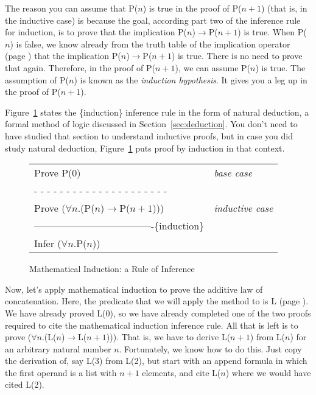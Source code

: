 The reason you can assume that P($n$) is true in the proof of P($n+1$)
(that is, in the inductive case)
is because the goal, according part two of the inference rule
for induction, is to prove that the implication
P($n$)$\rightarrow$P($n+1$) is true.
When P($n$) is false, we know already from the truth table
of the implication operator (page \pageref{implication-truth-table})
that the implication P($n$)$\rightarrow$P($n+1$) is true.
There is no need to prove that again.
Therefore, in the proof of P($n+1$), we can assume P($n$) is true.
The assumption of P($n$) is known as the
\emph{induction hypothesis}.
It gives you a leg up in the proof of P($n+1$).

Figure~\ref{induction-rule} states the \{induction\} inference rule
in the form of natural deduction, a formal method of logic discussed
in Section~\ref{sec:deduction}. You don't need to have studied that
section to understand inductive proofs, but in case you did study
natural deduction, Figure~\ref{induction-rule} puts proof by
induction in that context.

\begin{figure}
\begin{center}
\begin{tabular}{ll}
Prove P(0)                                         &\emph{base case}\\
 - - - - - - - - - - - - - - - - - - - - -         &\\
Prove ($\forall$$n$.(P($n$)$\rightarrow$P($n+1$))) &\emph{inductive case}\\
-------------------------------------\{induction\} &\\
Infer ($\forall$$n$.P($n$))                        &\\
\end{tabular}
\end{center}
\caption{Mathematical Induction: a Rule of Inference}
\label{fig-04-01}\label{induction-rule}
\end{figure}

\label{induction-hyp-def}Now,
let's apply mathematical induction to prove
the additive law of concatenation.
Here, the predicate that we will apply the method to is L
(page \pageref{additive-concat-law-predicate}).
\label{len-additive-thm}We
have already proved L(0), so we have already completed one of the
two proofs required to cite the mathematical induction inference rule.
All that is left is to prove ($\forall$$n$.(L($n$)$\rightarrow$L($n+1$))).
That is, we have to derive L($n+1$) from L($n$) for an arbitrary natural number $n$.
Fortunately, we know how to do this. Just copy the derivation of,
say L(3) from L(2), but start with an append formula in which the first operand
is a list with $n+1$ elements, and cite L($n$) where we would have cited L(2).

